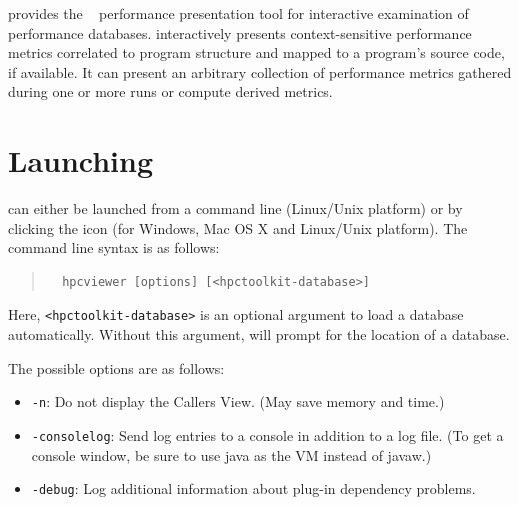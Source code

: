 

\HPCToolkit{} provides the \hpcviewer{}~\cite{Adhianto-MC-Ta:2010:PSTI-hpcviewer} performance presentation tool for interactive examination of performance databases.
\hpcviewer{} interactively presents context-sensitive performance metrics correlated to program structure and mapped to a program's source code, if available.
It can present an arbitrary collection of performance metrics gathered during one or more runs or compute derived metrics.



\section{Launching}

\hpcviewer{} can either be launched from a command line (Linux/Unix platform) or by clicking the \hpcviewer{} icon (for Windows, Mac OS X and Linux/Unix platform).
The command line syntax is as follows:
\begin{quote}
\begin{verbatim}
  hpcviewer [options] [<hpctoolkit-database>]
\end{verbatim}
\end{quote}
Here, \texttt{<hpctoolkit-database>} is an optional argument to load a database automatically.
Without this argument, \hpcviewer{} will prompt for the location of a database.

The possible options are as follows:
\begin{itemize}
 \item \texttt{-n}: Do not display the Callers View.  (May save memory and time.)

 \item \texttt{-consolelog}: Send log entries to a console in addition to a log file.
   (To get a console window, be sure to use java as the VM instead of javaw.)

 \item \texttt{-debug}: Log additional information about plug-in dependency problems.
\end{itemize}



